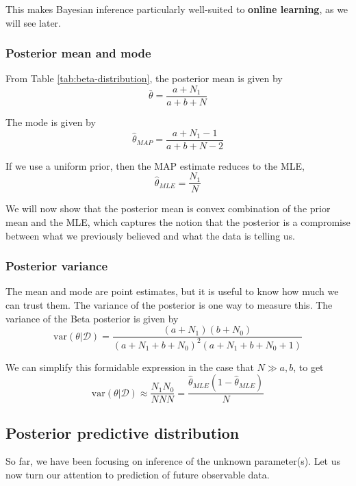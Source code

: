 This makes Bayesian inference particularly well-suited to \textbf{online learning}, as we will see later.

\subsubsection{Posterior mean and mode}
\label{sec:beta-binomial-Posterior-mean-and-mode}
From Table \ref{tab:beta-distribution}, the posterior mean is given by
\begin{equation}
\bar{\theta}=\dfrac{a+N_1}{a+b+N}
\end{equation}

The mode is given by
\begin{equation}
\hat{\theta}_{MAP}=\dfrac{a+N_1-1}{a+b+N-2}
\end{equation}

If we use a uniform prior, then the MAP estimate reduces to the MLE,
\begin{equation}
\hat{\theta}_{MLE}=\dfrac{N_1}{N}
\end{equation}

We will now show that the posterior mean is convex combination of the prior mean and the MLE, which captures the notion that the posterior is a compromise between what we previously believed and what the data is telling us.

\subsubsection{Posterior variance}
The mean and mode are point estimates, but it is useful to know how much we can trust them. The variance of the posterior is one way to measure this. The variance of the Beta posterior is given by
\begin{equation}
\text{var}(\theta|\mathcal{D})=\dfrac{(a+N_1)(b+N_0)}{(a+N_1+b+N_0)^2(a+N_1+b+N_0+1)}
\end{equation}

We can simplify this formidable expression in the case that $N \gg a, b$, to get
\begin{equation}
\text{var}(\theta|\mathcal{D}) \approx \dfrac{N_1N_0}{NNN}=\dfrac{\hat{\theta}_{MLE}(1-\hat{\theta}_{MLE})}{N}
\end{equation}


\subsection{Posterior predictive distribution}
So far, we have been focusing on inference of the unknown parameter(s). Let us now turn our attention to prediction of future observable data.

